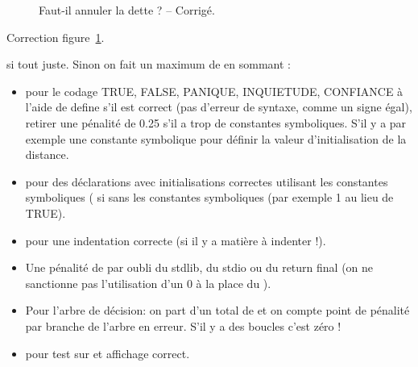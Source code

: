 \begin{correction}
\begin{figure}
  \centering
\begin{small}
\end{small} 
  \caption{Faut-il annuler la dette ? -- Corrigé.}
  \label{fig:dropdebt}
\end{figure}
Correction figure~\ref{fig:dropdebt}.
 \begin{baremeenv}
 si tout juste. Sinon on fait un maximum de  en sommant :
\begin{itemize}
\item 
   pour le codage TRUE, FALSE, PANIQUE, INQUIETUDE, CONFIANCE à l'aide de define s'il est correct (pas d'erreur de syntaxe, comme un signe égal), retirer une pénalité de 0.25 s'il a trop de constantes symboliques. S'il y a par exemple une constante symbolique pour définir la valeur d'initialisation de la distance.
\item {} pour des
  déclarations avec initialisations correctes utilisant les constantes
  symboliques ( si sans les constantes symboliques (par
  exemple 1 au lieu de TRUE).  
\item {} pour une indentation correcte (si il y a matière à
  indenter !).
\item  Une pénalité de  par oubli du stdlib, du  stdio ou du
  return final (on ne sanctionne pas l'utilisation d'un 0 à la place
  du ).
\item Pour l'arbre de décision: on part d'un total de  et on compte 
  point de pénalité par branche de l'arbre en erreur.  S'il y a des boucles c'est
  zéro ! 
\item {} pour test sur  et affichage correct.
\end{itemize}
  \end{baremeenv}
\end{correction}


